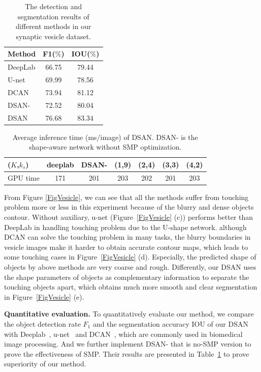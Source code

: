 \begin{table}
\begin{center}
\begin{tabular}{lcc}
\hline
Method & F1($\%$) & IOU($\%$) \\
\hline
DeepLab & 66.75 & 79.44 \\
U-net & 69.99 & 78.56 \\
DCAN & 73.94 & 81.12 \\
DSAN- & 72.52 & 80.04 \\
DSAN & $\mathbf{76.68}$ & $\mathbf{83.34}$\\
\hline
\end{tabular}
\end{center}
\caption{The detection and segmentation results of different methods in our synaptic vesicle dataset.}
\label{tab:vesicle}
\end{table}


\begin{table}
\begin{center}
\begin{tabular}{l|cccccc}
\hline
($K$,$k_s$) &deeplab& DSAN- & (1,9)& (2,4) & (3,3) & (4,2) \\
\hline
GPU time &171& 201 & 203 & 202 & 201& 203 \\
\hline
\end{tabular}
\end{center}
\caption{Average inference time (ms/image) of DSAN. DSAN- is the shape-aware network without SMP optimization.}
\label{tab:time}
\end{table}
From Figure \ref{FigVesicle}, we can see that all the methods suffer from touching problem more or less in this experiment because of the blurry and dense objects contour.
Without auxiliary, u-net (Figure~\ref{FigVesicle} (c)) performs better than DeepLab in handling touching problem due to the U-shape network.
although DCAN can solve the touching problem in many tasks, the blurry boundaries in vesicle images make it harder to obtain accurate contour maps, which leads to some touching cases in Figure~\ref{FigVesicle} (d).
Especially, the predicted shape of objects by above methods are very coarse and rough.
Differently, our DSAN uses the shape parameters of objects as complementary information to separate the touching objects apart, which obtains much more smooth and clear segmentation in Figure~\ref{FigVesicle} (e).

\noindent\textbf{Quantitative evaluation.}
To quantitatively evaluate our method, we compare the object detection rate $F_1$ and the segmentation accuracy IOU of our DSAN with Deeplab~\cite{Chen2014a}, u-net~\cite{Ronneberger2015} and DCAN~\cite{Chen2016b}, which are commonly used in biomedical image processing.
And we further implement DSAN- that is no-SMP version to prove the effectiveness of SMP.
Their results are presented in Table~\ref{tab:vesicle} to prove superiority of our method.

